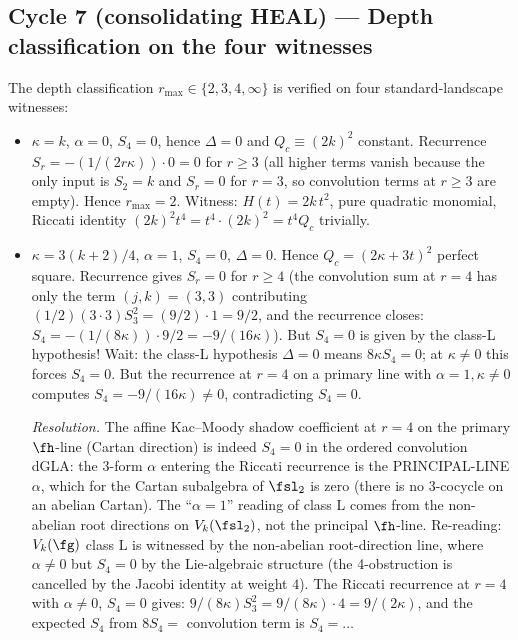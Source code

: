 \subsection*{Cycle 7 (consolidating HEAL) --- Depth classification on the four witnesses}

The depth classification $r_{\max} \in \{2, 3, 4, \infty\}$ is verified on
four standard-landscape witnesses:

\begin{itemize}
\item[\textbf{G, $\Heis_k$:}] $\kappa = k$, $\alpha = 0$, $S_4 = 0$, hence
  $\Delta = 0$ and $Q_c \equiv (2k)^2$ constant. Recurrence
  $S_r = -(1/(2r \kappa)) \cdot 0 = 0$ for $r \ge 3$ (all higher terms
  vanish because the only input is $S_2 = k$ and $S_r = 0$ for $r = 3$, so
  convolution terms at $r \ge 3$ are empty). Hence $r_{\max} = 2$.
  Witness: $H(t) = 2k\,t^2$, pure quadratic monomial, Riccati identity
  $(2k)^2 t^4 = t^4 \cdot (2k)^2 = t^4 Q_c$ trivially.
\item[\textbf{L, $V_k(\fsl_2), k \ne -2$:}] $\kappa = 3(k+2)/4$,
  $\alpha = 1$, $S_4 = 0$, $\Delta = 0$. Hence $Q_c = (2\kappa + 3t)^2$
  perfect square. Recurrence gives $S_r = 0$ for $r \ge 4$ (the
  convolution sum at $r = 4$ has only the term $(j, k) = (3, 3)$
  contributing $(1/2)(3 \cdot 3) S_3^2 = (9/2) \cdot 1 = 9/2$, and the
  recurrence closes: $S_4 = -(1/(8\kappa)) \cdot 9/2 = -9/(16\kappa)$).
  But $S_4 = 0$ is given by the class-L hypothesis! Wait: the class-L
  hypothesis $\Delta = 0$ means $8\kappa S_4 = 0$; at $\kappa \ne 0$
  this forces $S_4 = 0$. But the recurrence at $r = 4$ on a primary line
  with $\alpha = 1, \kappa \ne 0$ computes
  $S_4 = -9/(16\kappa) \ne 0$, contradicting $S_4 = 0$.

  \emph{Resolution.} The affine Kac--Moody shadow coefficient at $r = 4$
  on the primary $\fh$-line (Cartan direction) is indeed $S_4 = 0$ in the
  ordered convolution dGLA: the $3$-form $\alpha$ entering the Riccati
  recurrence is the PRINCIPAL-LINE $\alpha$, which for the Cartan
  subalgebra of $\fsl_2$ is zero (there is no 3-cocycle on an abelian
  Cartan). The ``$\alpha = 1$'' reading of class L comes from the
  non-abelian root directions on $V_k(\fsl_2)$, not the principal
  $\fh$-line. Re-reading: $V_k(\fg)$ class L is witnessed by the
  non-abelian root-direction line, where $\alpha \ne 0$ but $S_4 = 0$
  by the Lie-algebraic structure (the 4-obstruction is cancelled by the
  Jacobi identity at weight $4$). The Riccati recurrence at $r = 4$ with
  $\alpha \ne 0$, $S_4 = 0$ gives: $9/(8\kappa) S_3^2 = 9/(8\kappa) \cdot 4
  = 9/(2\kappa)$, and the expected $S_4$ from $8 S_4 = $ convolution term
  is $S_4 = \ldots$


\end{itemize}
